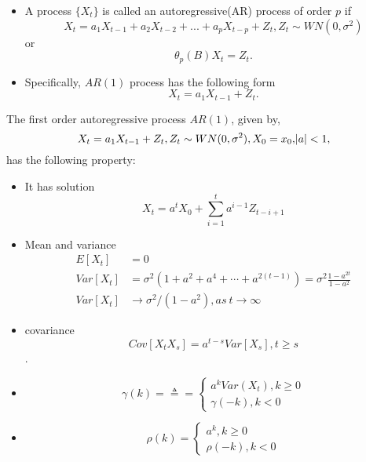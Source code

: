 \begin{definition}\cite[36]{chatfield2003analysis}
\begin{itemize}
	\item A process $\{X_t\}$ is called an autoregressive(AR) process of order $p$ if
	$$X_t = a_1 X_{t-1} + a_2 X_{t-2} + ... + a_p X_{t-p} + Z_t, Z_t\sim WN(0,\sigma^2)$$
	or
	$$\theta_p(B)X_t = Z_t.$$
	\item Specifically, 
	$AR(1)$ process has the following form
	$$X_t = a_1X_{t-1} + Z_t.$$
\end{itemize}	
\end{definition}



\begin{lemma}[$AR(1)$ properties]\label{ch:time-series-analysis:th:AR(1)processBasicProperties}
The first order autoregressive process $AR(1)$, given by,
	$$X_t = a_1X_{t-1} + Z_t, Z_t\sim WN(0,\sigma^2), X_0=x_0, \abs{a}<1,$$
 has the following property:
\begin{itemize}
    \item It has solution
    $$X_t = a^t X_0 + \sum_{i=1}^{t} a^{i-1}Z_{t-i+1}  $$
    \item Mean and variance
    \begin{align*}
    E[X_t] &= 0 \\
    Var[X_t] &= \sigma^2(1+a^2+a^4 + \cdots + a^{2(t-1)}) = \sigma^2\frac{1-a^{2t}}{1-a^2} \\ 
    Var[X_t] &\to \sigma^2/(1-a^2), as~t\to\infty
    \end{align*}
    \item covariance
    $$Cov[X_tX_s] = a^{t-s}Var[X_s], t\geq s$$.
    \item $$\gamma(k) = \triangleq  = \begin{cases} a^k Var(X_t), k\geq 0\\
        \gamma(-k), k<0
    \end{cases}$$
    \item $$\rho(k) = \begin{cases} a^k , k\geq 0\\
    \rho(-k), k<0
    \end{cases}$$
\end{itemize}
\end{lemma}
